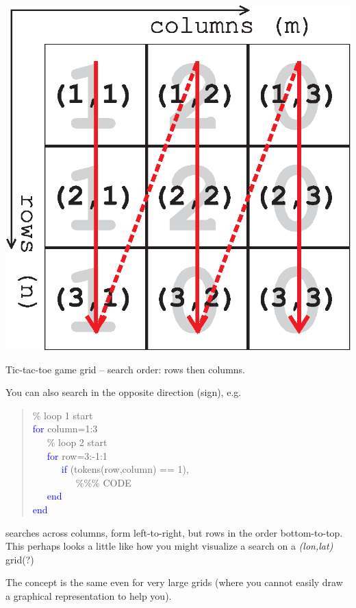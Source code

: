 \documentclass{tufte-book} %
\newenvironment{docspec}{\begin{quotation}\ttfamily\parskip0pt\parindent0pt\ignorespaces}{\end{quotation}}
\begin{document}
\begin{marginfigure}[0.5in]
\includegraphics[width=\linewidth]{ch6-grid5.eps}
\caption{Tic-tac-toe game grid -- search order: rows then columns.}
\label{fig:ch6-grid5}
\end{marginfigure}

You can also search in the opposite direction (sign), e.g.
\begin{docspec}
\textcolor[rgb]{0,0.501961,0}{\% loop 1 start\\}
\textcolor{blue}{for} column=1:3\\
\ \ \ \textcolor[rgb]{0,0.501961,0}{\% loop 2 start\\}
\ \ \ \textcolor{blue}{for} row=3:-1:1\\
\ \ \ \ \ \ \textcolor{blue}{if} (tokens(row,column) == 1),\\
\ \ \ \ \ \ \ \ \ \textcolor[rgb]{0,0.501961,0}{\%\%\% CODE}\\
\ \ \ \textcolor{blue}{end}\\
\textcolor{blue}{end}
\end{docspec}
searches across columns, form left-to-right, but rows in the order bottom-to-top. This perhaps looks a little like how you might visualize a search on a \textit{(lon,lat)} grid(?)

The concept is the same even for very large grids (where you cannot easily draw a graphical representation to help you).
\end{document}
